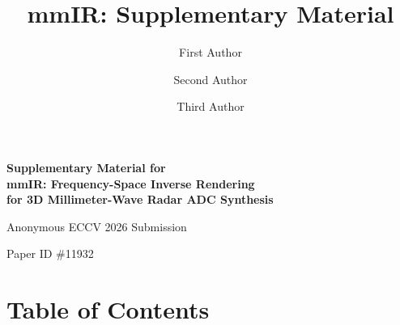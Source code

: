 \documentclass[runningheads]{llncs}
\begin{document}
\title{mmIR: Supplementary Material}


\author{First Author \and
Second Author \and
Third Author}



{\centering
  {\Large\bfseries Supplementary Material for\\ mmIR: Frequency-Space Inverse Rendering\\ for 3D Millimeter-Wave Radar ADC Synthesis\par}
  \vspace{0.5em}
  {Anonymous ECCV 2026 Submission\par}
  \vspace{0.25em}
  {Paper ID \#11932\par}
  \vspace{1.5em}
}

\setcounter{tocdepth}{2}
\section*{Table of Contents}
\vspace{-0.5em}
\begingroup
\hypersetup{linkcolor=black}
\small
\makeatletter
{}
\makeatother
\endgroup
\vspace{1em}

\end{document}

